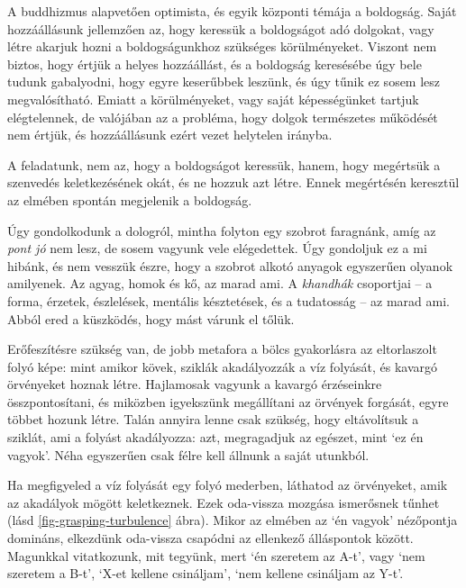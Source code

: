 
A buddhizmus alapvetően optimista, és egyik központi témája a boldogság.
Saját hozzáállásunk jellemzően az, hogy keressük a boldogságot adó
dolgokat, vagy létre akarjuk hozni a boldogságunkhoz szükséges
körülményeket. Viszont nem biztos, hogy értjük a helyes hozzáállást, és
a boldogság keresésébe úgy bele tudunk gabalyodni, hogy egyre keserűbbek
leszünk, és úgy tűnik ez sosem lesz megvalósítható. Emiatt a
körülményeket, vagy saját képességünket tartjuk elégtelennek, de
valójában az a probléma, hogy dolgok természetes működését nem értjük,
és hozzáállásunk ezért vezet helytelen irányba.

A feladatunk, nem az, hogy a boldogságot keressük, hanem, hogy megértsük
a szenvedés keletkezésének okát, és ne hozzuk azt létre. Ennek
megértésén keresztül az elmében spontán megjelenik a boldogság.

Úgy gondolkodunk a dologról, mintha folyton egy szobrot faragnánk, amíg
az \emph{pont jó} nem lesz, de sosem vagyunk vele elégedettek. Úgy
gondoljuk ez a mi hibánk, és nem vesszük észre, hogy a szobrot alkotó
anyagok egyszerűen olyanok amilyenek. Az agyag, homok és kő, az marad
ami. A \emph{khandhák} csoportjai -- a forma, érzetek, észlelések,
mentális késztetések, és a tudatosság -- az marad ami. Abból ered a
küszködés, hogy mást várunk el tőlük.

Erőfeszítésre szükség van, de jobb metafora a bölcs gyakorlásra az
eltorlaszolt folyó képe: mint amikor kövek, sziklák akadályozzák a víz
folyását, és kavargó örvényeket hoznak létre. Hajlamosak vagyunk a
kavargó érzéseinkre összpontosítani, és miközben igyekszünk megállítani
az örvények forgását, egyre többet hozunk létre. Talán annyira lenne
csak szükség, hogy eltávolítsuk a sziklát, ami a folyást akadályozza:
azt, megragadjuk az egészet, mint `ez én vagyok'. Néha egyszerűen csak
félre kell állnunk a saját utunkból.

Ha megfigyeled a víz folyását egy folyó mederben, láthatod az
örvényeket, amik az akadályok mögött keletkeznek. Ezek oda-vissza
mozgása ismerősnek tűnhet (lásd \ref{fig-grasping-turbulence} ábra).
Mikor az elmében az `én vagyok' nézőpontja domináns, elkezdünk
oda-vissza csapódni az ellenkező álláspontok között. Magunkkal
vitatkozunk, mit tegyünk, mert `én szeretem az A-t', vagy `nem szeretem
a B-t', `X-et kellene csináljam', `nem kellene csináljam az Y-t'.

\enlargethispage*{\baselineskip}

